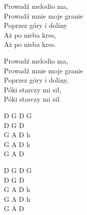 \begin{text}
    Prowadź melodio ma,\\
    Prowadź mnie moje granie\\
    Poprzez góry i doliny\\
    Aż po nieba kres,\\
    Aż po nieba kres.

    Prowadź melodio ma,\\
    Prowadź mnie moje granie\\
    Poprzez góry i doliny,\\
    Póki starczy mi sił,\\
    Póki starczy mi sił.
\end{text}
\begin{chord}
    D G D G\\
    D G D\\
    G A D h\\
    G A D h\\
    G A D

    D G D G\\
    D G D\\
    G A D h\\
    G A D h\\
    G A D
\end{chord}